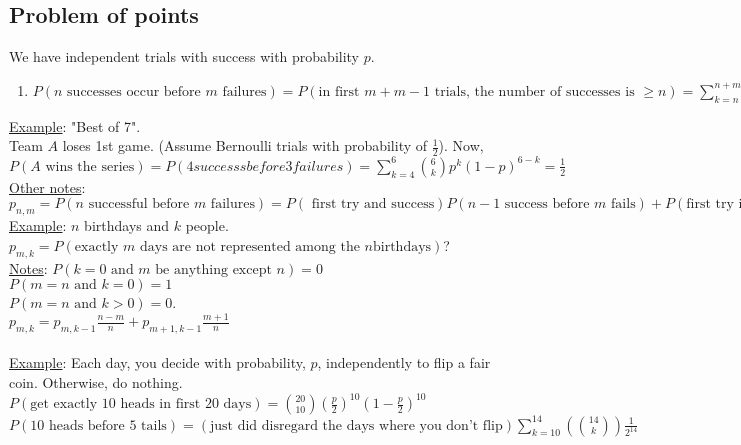   \subsection*{Problem of points}
    We have independent trials with success with probability $p$.
    \begin{enumerate}
      \item $P(\text{$n$ successes occur before $m$ failures}) = 
      P(\text{in first $m+m-1$ trials, the number of successes is $\ge n$}) = 
      \sum_{k = n}^{n + m - 1} \binom{n+m-1}{k} p^k (1-p)^{n + m - 1 - k}$
    \end{enumerate}
    \underline{Example}: "Best of 7".\\
      Team $A$ loses 1st game. (Assume Bernoulli trials with probability of
      $\frac{1}{2}$). Now,\\
      $P(\text{$A$ wins the series}) = P(4 successs before 3 failures) = 
      \sum_{k = 4}^6 \binom{6}{k} p^k(1-p)^{6-k} = \frac{1}{2}$\\
    \underline{Other notes}:\\
      $p_{n,m} = P(\text{$n$ successful before $m$ failures}) = P(\text{ first
        try and success})P(\text{$n-1$ success before $m$ fails}) + P(\text{
        first try is failure})P(\text{$n$ success before $m - 1$ fails}) = 
      pp_{n-1,m} +(1-p)p_{n, m-1}$\\
    \underline{Example}: $n$ birthdays and $k$ people.\\
      $p_{m, k} = P(\text{exactly $m$ days are not represented among the $n$
      birthdays})$?\\
    \underline{Notes}: $P(\text{$k = 0$ and $m$ be anything except $n$}) = 0$\\
    $P(\text{$m = n$ and $k = 0$}) = 1$\\
    $P(\text{$m = n$ and $k >0$}) = 0$.\\
    $p_{m,k} = p_{m, k-1}\frac{n-m}{n} + p_{m+1, k-1} \frac{m+1}{n}$\\\\
  \underline{Example}: Each day, you decide with probability, $p$, independently
    to flip a fair coin. Otherwise, do nothing. \\
    $P(\text{get exactly 10 heads in first 
      20 days}) = \binom{20}{10} (\frac{p}{2})^{10}(1-\frac{p}{2})^{10}$\\
    $P(\text{10 heads before 5 tails}) = (\text{just did disregard the days 
    where you don't flip}) \sum_{k= 10}^{14} (\binom{14}{k})\frac{1}{2^{14}}$


